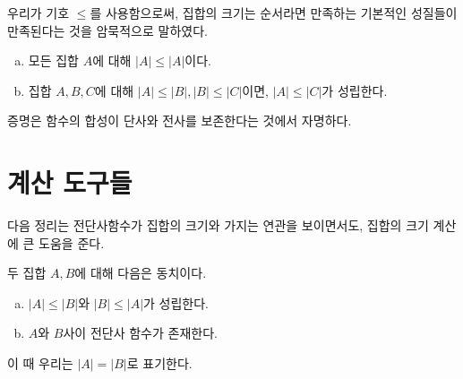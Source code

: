 우리가 기호 $\leq$를 사용함으로써, 집합의 크기는 순서라면 만족하는 기본적인 성질들이 만족된다는 것을 암묵적으로 말하였다.
\begin{theorem}
    \begin{enumerate}[(a)]
        \item 모든 집합 $A$에 대해 $|A| \leq |A|$이다.
        \item 집합 $A, B, C$에 대해 $|A| \leq |B|, |B| \leq |C|$이면, $|A| \leq |C|$가 성립한다.
    \end{enumerate}
\end{theorem}
증명은 함수의 합성이 단사와 전사를 보존한다는 것에서 자명하다.

\section{계산 도구들}
다음 정리는 전단사함수가 집합의 크기와 가지는 연관을 보이면서도, 집합의 크기 계산에 큰 도움을 준다.
\begin{theorem}
\label{thm:schbern}
    두 집합 $A, B$에 대해 다음은 동치이다.
    \begin{enumerate}[(a)]
        \item $|A| \leq |B|$와 $|B| \leq |A|$가 성립한다.
        \item $A$와 $B$사이 전단사 함수가 존재한다.
    \end{enumerate}
    이 때 우리는 $|A| = |B|$로 표기한다.
\end{theorem}
